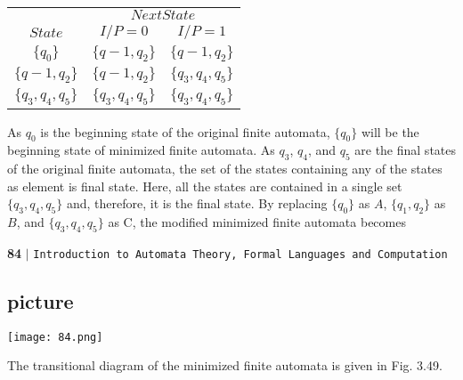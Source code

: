 \documentclass{article}
\begin{document}
\begin{center}
\begin{tabular}{ccc}
 \hline

 \hline

 \hline

 \hline
 & \multicolumn{2}{c}{$Next State$}\\
 \cline{2-3}
 $State$ &  $I/P=0$ & $I/P=1$\\
\hline
 $\{q_0\}$           &   $\{q-1,q_2\}$      &  $\{q-1,q_2\}$          \\
 $\{q-1,q_2\}$       &   $\{q-1,q_2\}$      &  $\{q_3,q_4,q_5\}$   \\
 $\{q_3,q_4,q_5\}$   &   $\{q_3,q_4,q_5\}$  &  $\{q_3,q_4,q_5\}$  \\
 \hline

 \hline

 \hline

 \hline
\end{tabular}
\end{center}


As $q_0$ is the beginning state of the original finite automata, $\{q_0\}$ will be the beginning state of minimized
finite automata. As $q_3$, $q_4$, and $q_5$ are the final states of the original finite automata, the set of the states
containing any of the states as element is final state. Here, all the states are contained in a single set
$\{q_3, q_4, q_5\}$ and, therefore, it is the final state. By replacing $\{q_0\}$ as $A$, $\{q_1, q_2\}$ as $B$, and $\{q_3, q_4, q_5\}$ as C,
the modified minimized finite automata becomes

\begin{flushleft}
    \textbf{84}\hspace*{0.1cm} \textbf{$|$} \hspace*{0.1cm} \texttt{Introduction to Automata Theory, Formal Languages and Computation}
  \end{flushleft}

\begin{center}
\section{picture}
\texttt{[image: 84.png]}
\end{center}

The transitional diagram of the minimized finite automata is given in Fig. 3.49.
\end{document}
